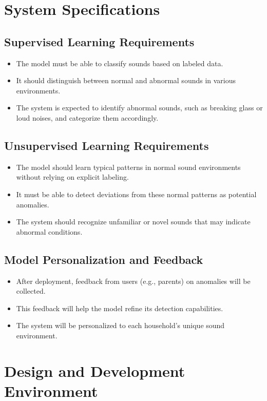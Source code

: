 \documentclass[conference]{IEEEtran}
\begin{document}
\section{System Specifications}
\subsection{Supervised Learning Requirements}
\begin{itemize}
    \item The model must be able to classify sounds based on labeled data.
    \item It should distinguish between normal and abnormal sounds in various environments.
    \item The system is expected to identify abnormal sounds, such as breaking glass or loud noises, and categorize them accordingly.
\end{itemize}

\subsection{Unsupervised Learning Requirements}
\begin{itemize}
    \item The model should learn typical patterns in normal sound environments without relying on explicit labeling.
    \item It must be able to detect deviations from these normal patterns as potential anomalies.
    \item The system should recognize unfamiliar or novel sounds that may indicate abnormal conditions.
\end{itemize}

\subsection{Model Personalization and Feedback}
\begin{itemize}
    \item After deployment, feedback from users (e.g., parents) on anomalies will be collected.
    \item This feedback will help the model refine its detection capabilities.
    \item The system will be personalized to each household's unique sound environment.
\end{itemize}

\section{Design and Development Environment}
\end{document}
